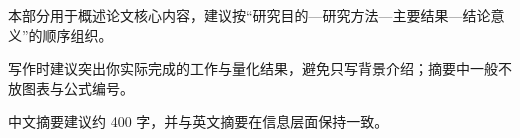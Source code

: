 \begin{cabstract}

\linespread{1.08}\selectfont

本部分用于概述论文核心内容，建议按“研究目的—研究方法—主要结果—结论意义”的顺序组织。

写作时建议突出你实际完成的工作与量化结果，避免只写背景介绍；摘要中一般不放图表与公式编号。

中文摘要建议约 400 字，并与英文摘要在信息层面保持一致。


\end{cabstract}
